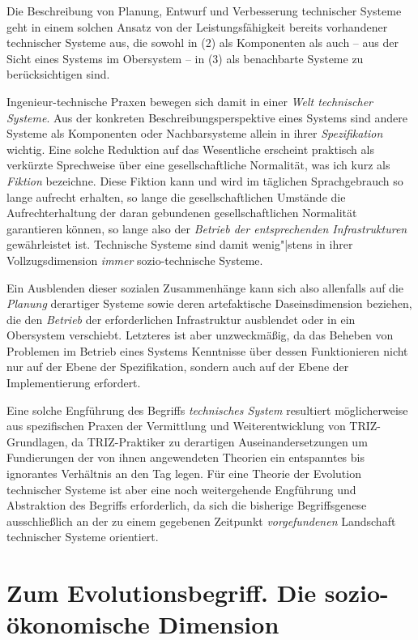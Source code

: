 \documentclass[11pt,a4paper]{article}
\begin{document}
Die Beschreibung von Planung, Entwurf und Verbesserung technischer Systeme
geht in einem solchen Ansatz von der Leistungsfähigkeit bereits vorhandener
technischer Systeme aus, die sowohl in (2) als Komponenten als auch -- aus der
Sicht eines Systems im Obersystem -- in (3) als benachbarte Systeme zu
berücksichtigen sind.

Ingenieur-technische Praxen bewegen sich damit in einer \emph{Welt technischer
  Systeme}. Aus der konkreten Beschreibungsperspektive eines Systems sind
andere Systeme als Komponenten oder Nachbarsysteme allein in ihrer
\emph{Spezifikation} wichtig. Eine solche Reduktion auf das Wesentliche
erscheint praktisch als verkürzte Sprechweise über eine gesellschaftliche
Normalität, was ich kurz als \emph{Fiktion} bezeichne.  Diese Fiktion kann und
wird im täglichen Sprachgebrauch so lange aufrecht erhalten, so lange die
gesellschaftlichen Umstände die Aufrechterhaltung der daran gebundenen
gesellschaftlichen Normalität garantieren können, so lange also der
\emph{Betrieb der entsprechenden Infrastrukturen} gewährleistet ist.
Technische Systeme sind damit wenig"|stens in ihrer Vollzugsdimension
\emph{immer} sozio-technische Systeme.

Ein Ausblenden dieser sozialen Zusammenhänge kann sich also allenfalls auf die
\emph{Planung} derartiger Systeme sowie deren artefaktische Daseinsdimension
beziehen, die den \emph{Betrieb} der erforderlichen Infrastruktur ausblendet
oder in ein Obersystem verschiebt.  Letzteres ist aber unzweckmäßig, da das
Beheben von Problemen im Betrieb eines Systems Kenntnisse über dessen
Funktionieren nicht nur auf der Ebene der Spezifikation, sondern auch auf der
Ebene der Implementierung erfordert.

Eine solche Engführung des Begriffs \emph{technisches System} resultiert
möglicherweise aus spezifischen Praxen der Vermittlung und Weiterentwicklung
von TRIZ-Grundlagen, da TRIZ-Praktiker zu derartigen Auseinandersetzungen um
Fundierungen der von ihnen angewendeten Theorien ein entspanntes bis
ignorantes Verhältnis an den Tag legen. Für eine Theorie der Evolution
technischer Systeme ist aber eine noch weitergehende Engführung und
Abstraktion des Begriffs erforderlich, da sich die bisherige Begriffsgenese
ausschließlich an der zu einem gegebenen Zeitpunkt \emph{vorgefundenen}
Landschaft technischer Systeme orientiert.

\section{Zum Evolutionsbegriff. Die sozio-ökonomische Dimension} 
\end{document}
